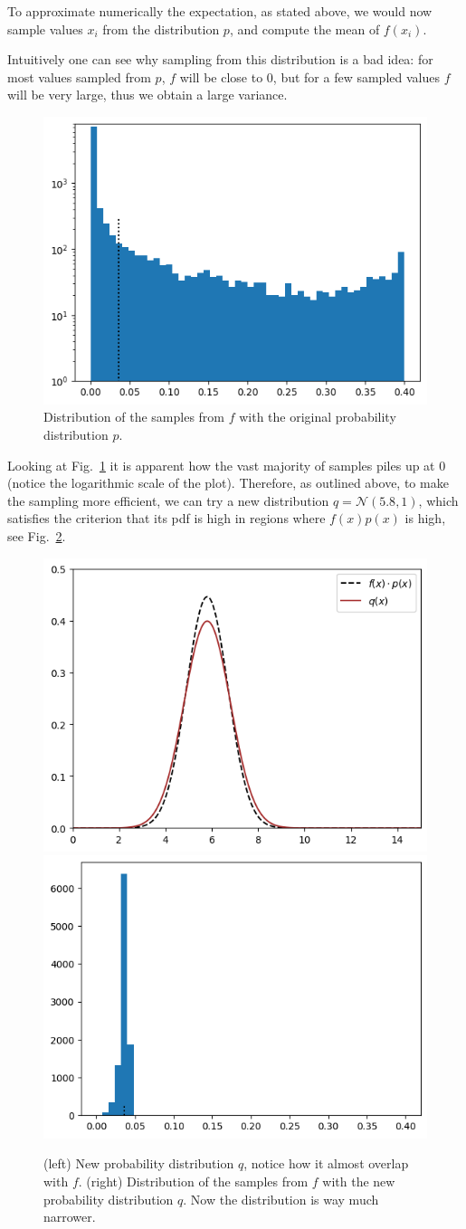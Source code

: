 \documentclass[12pt,a4paper]{book}
\begin{document}
To approximate numerically the expectation, as stated above, we would now sample values $x_i$ from the distribution $p$, and compute the mean of $f(x_i)$.

Intuitively one can see why sampling from this distribution is a bad idea: for most values sampled from $p$, $f$ will be close to 0, but for a few sampled values $f$ will be very large, thus we obtain a large variance.

\begin{figure}[htbp]
\begin{center}
\includegraphics[width=0.5\linewidth]{addons/bad_sampling}
\end{center}
\caption{Distribution of the samples from $f$ with the original probability distribution $p$.}
\label{fig:bad_sampling}
\end{figure}

Looking at Fig.~\ref{fig:bad_sampling} it is apparent how the vast majority of samples piles up at 0 (notice the logarithmic scale of the plot). 
Therefore, as outlined above, to make the sampling more efficient, we can try a new distribution $q = \mathcal{N}(5.8, 1)$, which satisfies the criterion that its pdf is high in regions where $f(x)p(x)$ is high, see Fig.~\ref{fig:fp_and_q}.

\begin{figure}[htbp]
\begin{center}
\includegraphics[width=0.4\linewidth]{addons/fp_and_q}
\includegraphics[width=0.4\linewidth]{addons/good_sampling}
\end{center}
\caption{(left) New probability distribution $q$, notice how it almost overlap with $f$. (right) Distribution of the samples from $f$ with the new probability distribution $q$. Now the distribution is way much narrower.}
\label{fig:fp_and_q}
\end{figure}
\end{document}
